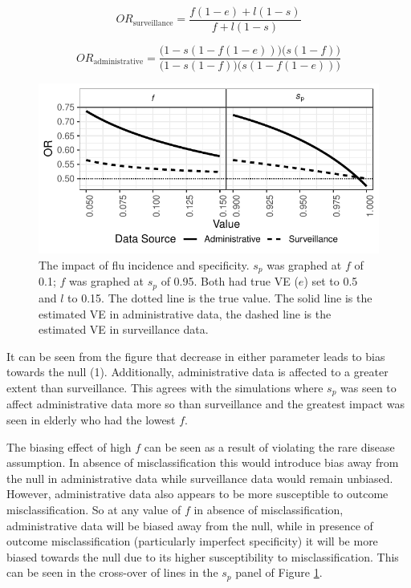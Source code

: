 \documentclass[11pt]{article}
\begin{document}
\begin{equation} \label{EqSFORA}
OR_{\text{surveillance}} = \frac{f(1-e)+l(1-s)}{f+l(1-s)}
\end{equation}

\begin{equation} \label{EqSFORAll}
OR_{\text{administrative}} = \frac{\Big(1-s(1-f(1-e))\Big)\Big(s(1-f)\Big)}{\Big(1-s(1-f)\Big)\Big(s(1-f(1-e))\Big)}
\end{equation}

\begin{figure}[h]
	\centering
		\includegraphics[width=0.75\linewidth]{../fig-sfinv/sfinv.pdf}
		\caption{
The impact of flu incidence and specificity. $s_p$ was graphed at $f$ of 0.1; $f$ was graphed at $s_p$ of 0.95. Both had true VE ($e$) set to 0.5 and $l$ to 0.15. The dotted line is the true value. The solid line is the estimated VE in administrative data, the dashed line is the estimated VE in surveillance data. \label{SFIPfGraph}
		}
\end{figure}

It can be seen from the figure that  decrease in either parameter leads to bias towards the null (1). Additionally, administrative data is affected to a greater extent than surveillance. This agrees with the simulations where $s_p$ was seen to affect administrative data more so than surveillance and the greatest impact was seen in elderly who had the lowest $f$.

The biasing effect of high $f$ can be seen as a result of violating the rare disease assumption. In absence of misclassification this would introduce bias away from the null in administrative data while surveillance data would remain unbiased. However, administrative data also appears to be more susceptible to outcome misclassification. So at any value of $f$ in absence of misclassification, administrative data will be biased away from the null, while in presence of outcome misclassification (particularly imperfect specificity) it will be more biased towards the null due to its higher susceptibility to misclassification. This can be seen in the cross-over of lines in the $s_p$ panel of Figure \ref{SFIPfGraph}.
\end{document}

